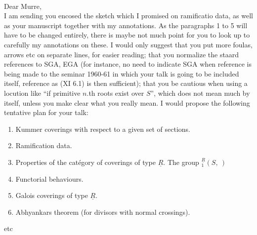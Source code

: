 \hfill{}\\

Dear Murre,\\

I am sending you encosed the sketch which I promised on ramificatio
data, as well as your manuscript together with my annotations. As the paragraphs 1 to 5 will have to be changed entirely, there is maybe not much point for you to look up to carefully my annotations on these.  I would only suggest that you put more foulas, arrows etc on  separate lines, for easier reading; that you normalize the staard references to SGA, EGA (for instance, no need to indicate SGA when reference is being made to the seminar 1960-61 in which your talk is going to be included itself, reference as (XI 6.1) is then sufficient); that you be cautious when using a locution like ``if primitive $n$.th roots exist over $S$'', which does not mean much by itself, unless you make clear what you really mean. I would propose the following tentative plan for your talk:

\begin{enumerate}[label={}]
\item[1.] Kummer coverings with respect to a given set of sections.
\item[2.] Ramification data.
\reversemarginpar
{}
\normalmarginpar
\item[3.] Properties of the catégory of coverings of type $\underline{R}$. The group ${}_{1}^{\underline{R}}(S,\ )$
\item[4.] Functorial behaviours.
\item[5.] Galois coverings of type $\underline{R}$.
\item[6.] Abhyankars theorem (for divisors with normal crossings).
\end{enumerate}
etc

